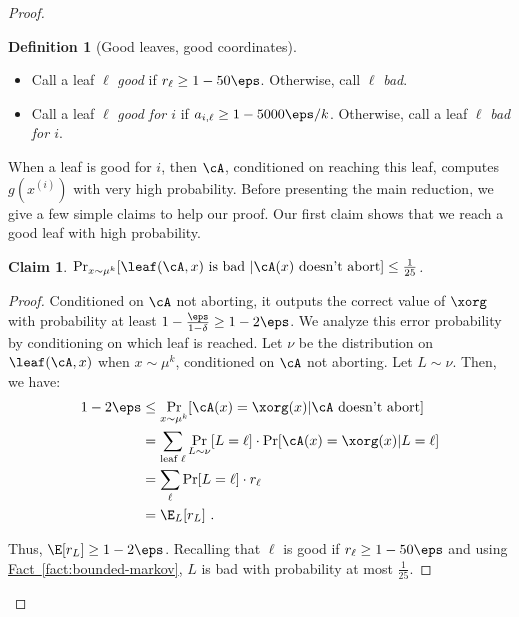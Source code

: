 \documentclass[11pt]{article}
\numberwithin{equation}{section}
\newtheorem{claim}[theorem]{Claim}
\theoremstyle{definition}
\newtheorem{definition}[theorem]{Definition}
\theoremstyle{plain}
\newcommand{\expref}[2]{\hyperref[#2]{#1~\ref{#2}}}
\begin{document}
\begin{proof}
\begin{definition}[Good leaves, good coordinates]
    \begin{itemize}
    \item Call a leaf $\ell$ \emph{good} if $r_\ell \geq 1-50\eps$.
      Otherwise, call $\ell$ \emph{bad}.
    \item Call a leaf $\ell$ \emph{good for $i$} if
      $a_{i,\ell} \geq 1-5000\eps/k$.  Otherwise, call a leaf $\ell$
      \emph{bad for $i$}.
    \end{itemize}
  \end{definition}
  When a leaf is good for $i$, then $\cA$, conditioned on reaching
  this leaf, computes $g(x^{(i)})$ with very high probability.  Before
  presenting the main reduction, we give a few simple claims to help
  our proof.  Our first claim shows that we reach a good leaf with
  high probability.

  \begin{claim}\label{claim:leaf-good}
    $\Pr_{x \sim \mu^k}[\leaf(\cA,x) \text{ is bad } | \cA(x) \text{
      doesn't abort}] \leq \frac{1}{25}$.
  \end{claim}
  \begin{proof}
    Conditioned on $\cA$ not aborting, it outputs the correct value of
    $\xorg$ with probability at least
    $1-\frac{\eps}{1-\delta} \geq 1-2\eps$.  We analyze this error
    probability by conditioning on which leaf is reached.  Let $\nu$
    be the distribution on $\leaf(\cA,x)$ when $x \sim \mu^k$,
    conditioned on $\cA$ not aborting.  Let $L\sim \nu$.  Then, we
    have:
\begin{align*}
  1-2\eps &\leq \Pr_{x\sim \mu^k}[\cA(x) = \xorg(x) | \cA \text{ doesn't abort}] \\
  &= \sum_{\text{leaf }\ell } \Pr_{L \sim \nu}[L = \ell]\cdot \Pr[\cA(x) = \xorg(x) | L=\ell] \\
  &= \sum_\ell \Pr[L=\ell]\cdot r_\ell \\
  &= \E_L[r_L]\ .
\end{align*}

Thus, $\E[r_L] \geq 1-2\eps$.  Recalling that $\ell$ is good if
$r_\ell \geq 1-50\eps$ and using \expref{Fact}{fact:bounded-markov}, $L$
is bad with probability at most $\frac{1}{25}$.
  \end{proof}


\end{proof}
\end{document}

